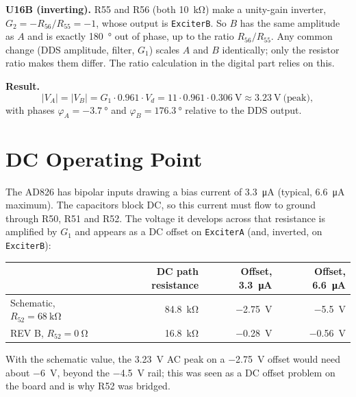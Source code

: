 \documentclass[11pt,a4paper]{article}
\begin{document}
\textbf{U16B (inverting).}  R55 and R56 (both \SI{10}{\kilo\ohm}) make a
unity-gain inverter, $G_2 = -R_{56}/R_{55} = -1$, whose output is
\texttt{ExciterB}.  So $B$ has the same amplitude as $A$ and is exactly
\SI{180}{\degree} out of phase, up to the ratio $R_{56}/R_{55}$.  Any common
change (DDS amplitude, filter, $G_1$) scales $A$ and $B$ identically; only
the resistor ratio makes them differ.  The ratio calculation in the digital
part relies on this.

\textbf{Result.}
\begin{equation}
  \boxed{\;|V_A| = |V_B| = G_1\cdot 0.961\cdot V_d
    = 11\cdot 0.961\cdot\SI{0.306}{\volt} \approx \SI{3.23}{\volt}\ \text{(peak)},\;}
\end{equation}
with phases $\varphi_A=\SI{-3.7}{\degree}$ and
$\varphi_B=\SI{+176.3}{\degree}$ relative to the DDS output.

\section{DC Operating Point}
\label{sec:dc}

The AD826 has bipolar inputs drawing a bias current of
\SI{3.3}{\micro\ampere} (typical, \SI{6.6}{\micro\ampere} maximum).  The
capacitors block DC, so this current must flow to ground through R50, R51
and R52.  The voltage it develops across that resistance is amplified by
$G_1$ and appears as a DC offset on \texttt{ExciterA} (and, inverted, on
\texttt{ExciterB}):

\begin{center}
\begin{tabular}{@{}lrrr@{}}
\toprule
 & DC path resistance & Offset, \SI{3.3}{\micro\ampere} & Offset, \SI{6.6}{\micro\ampere} \\
\midrule
Schematic, $R_{52}=\SI{68}{\kilo\ohm}$ & \SI{84.8}{\kilo\ohm} & \SI{-2.75}{\volt} & \SI{-5.5}{\volt} \\
REV B, $R_{52}=\SI{0}{\ohm}$           & \SI{16.8}{\kilo\ohm} & \SI{-0.28}{\volt} & \SI{-0.56}{\volt} \\
\bottomrule
\end{tabular}
\end{center}

With the schematic value, the \SI{3.23}{\volt} AC peak on a
\SI{-2.75}{\volt} offset would need about \SI{-6}{\volt}, beyond the
\SI{-4.5}{\volt} rail; this was seen as a DC offset problem on the board and
is why R52 was bridged.
\end{document}

